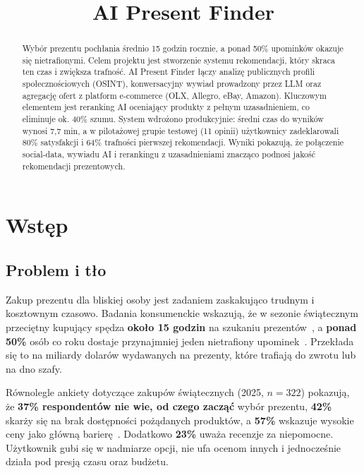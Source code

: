 \documentclass[polish,edition=2025]{zpiday}
\title{AI Present Finder}
\begin{document}
\maketitle

\begin{abstract}
Wybór prezentu pochłania średnio 15 godzin rocznie, a ponad 50\% upominków okazuje się nietrafionymi. Celem projektu jest stworzenie systemu rekomendacji, który skraca ten czas i zwiększa trafność. AI Present Finder łączy analizę publicznych profili społecznościowych (OSINT), konwersacyjny wywiad prowadzony przez LLM oraz agregację ofert z platform e-commerce (OLX, Allegro, eBay, Amazon). Kluczowym elementem jest reranking AI oceniający produkty z pełnym uzasadnieniem, co eliminuje ok. 40\% szumu. System wdrożono produkcyjnie: średni czas do wyników wynosi 7,7 min, a w pilotażowej grupie testowej (11 opinii) użytkownicy zadeklarowali 80\% satysfakcji i 64\% trafności pierwszej rekomendacji. Wyniki pokazują, że połączenie social-data, wywiadu AI i rerankingu z uzasadnieniami znacząco podnosi jakość rekomendacji prezentowych.
\end{abstract}

\section{Wstęp}

\subsection{Problem i tło}

Zakup prezentu dla bliskiej osoby jest zadaniem zaskakująco trudnym i kosztownym czasowo. Badania konsumenckie wskazują, że w sezonie świątecznym przeciętny kupujący spędza \textbf{około 15 godzin} na szukaniu prezentów~\cite{consumer-reports}, a \textbf{ponad 50\%} osób co roku dostaje przynajmniej jeden nietrafiony upominek~\cite{finder-gifts}. Przekłada się to na miliardy dolarów wydawanych na prezenty, które trafiają do zwrotu lub na dno szafy.

Równolegle ankiety dotyczące zakupów świątecznych (2025, $n=322$) pokazują, że \textbf{37\% respondentów nie wie, od czego zacząć} wybór prezentu, \textbf{42\%} skarży się na brak dostępności pożądanych produktów, a \textbf{57\%} wskazuje wysokie ceny jako główną barierę~\cite{kinetic319}. Dodatkowo \textbf{23\%} uważa recenzje za niepomocne. Użytkownik gubi się w nadmiarze opcji, nie ufa ocenom innych i jednocześnie działa pod presją czasu oraz budżetu.
\end{document}
